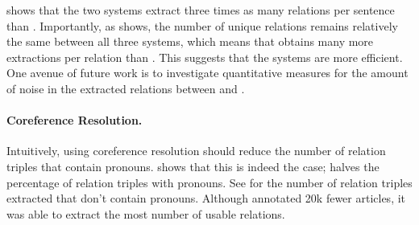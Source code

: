

 shows that
the two \openie{} systems extract three times
as many relations per sentence than \reverb{}. Importantly,
as  shows, the number of unique relations 
remains relatively the same between all three systems, which
means that \openie{} obtains many more extractions per
relation than \reverb{}.
This suggests 
that the \openie{} systems are more efficient. One avenue
of future work is to investigate quantitative measures for
the amount of noise in the extracted relations between \openie{}
and \reverb{}.

\paragraph{Coreference Resolution.}


Intuitively, using coreference resolution should reduce the number
of relation triples that contain pronouns.  shows
that this is indeed the case; \openiecoref{} halves the percentage
of relation triples with pronouns. See  for the
number of relation triples extracted that don't contain pronouns.
Although \openiecoref{} annotated 20k fewer articles, it was able
to extract the most number of usable relations.
